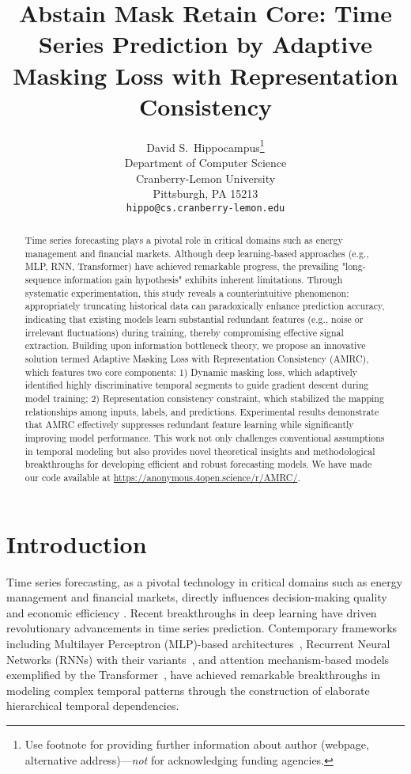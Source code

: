 \documentclass{article}
\title{Abstain Mask Retain Core: Time Series Prediction by Adaptive Masking Loss with Representation Consistency}
\author{%
  David S.~Hippocampus\thanks{Use footnote for providing further information
    about author (webpage, alternative address)---\emph{not} for acknowledging
    funding agencies.} \\
  Department of Computer Science\\
  Cranberry-Lemon University\\
  Pittsburgh, PA 15213 \\
  \texttt{hippo@cs.cranberry-lemon.edu} \\
}
\begin{document}
\maketitle


\begin{abstract}
Time series forecasting plays a pivotal role in critical domains such as energy management and financial markets. Although deep learning-based approaches (e.g., MLP, RNN, Transformer) have achieved remarkable progress, the prevailing "long-sequence information gain hypothesis" exhibits inherent limitations. Through systematic experimentation, this study reveals a counterintuitive phenomenon: appropriately truncating historical data can paradoxically enhance prediction accuracy, indicating that existing models learn substantial redundant features (e.g., noise or irrelevant fluctuations) during training, thereby compromising effective signal extraction. Building upon information bottleneck theory, we propose an innovative solution termed Adaptive Masking Loss with Representation Consistency (AMRC), which features two core components: 1) Dynamic masking loss, which adaptively identified highly discriminative temporal segments to guide gradient descent during model training; 2) Representation consistency constraint, which stabilized the mapping relationships among inputs, labels, and predictions. Experimental results demonstrate that AMRC effectively suppresses redundant feature learning while significantly improving model performance. This work not only challenges conventional assumptions in temporal modeling but also provides novel theoretical insights and methodological breakthroughs for developing efficient and robust forecasting models. We have made our code available at \url{https://anonymous.4open.science/r/AMRC/}.
\end{abstract}
\vspace{-1em}
\section{Introduction}
Time series forecasting, as a pivotal technology in critical domains such as energy management and financial markets, directly influences decision-making quality and economic efficiency \cite{timesurvey, timesurvey2,timesurvey3,timesurvey4,timesurvey5}. Recent breakthroughs in deep learning have driven revolutionary advancements in time series prediction.  Contemporary frameworks including Multilayer Perceptron (MLP)-based architectures~\cite{N-BEATS, DLinear, tsmixer, fits,tide,frequency}, Recurrent Neural Networks (RNNs) with their variants~\cite{segrnn, lstmlong, rnn_time}, and attention mechanism-based models exemplified by the Transformer~\cite{autotransformer, informer,crossformer, PatchTST,fedformer,pathformer,tactis}, have achieved remarkable breakthroughs in modeling complex temporal patterns through the construction of elaborate hierarchical temporal dependencies.
\end{document}
